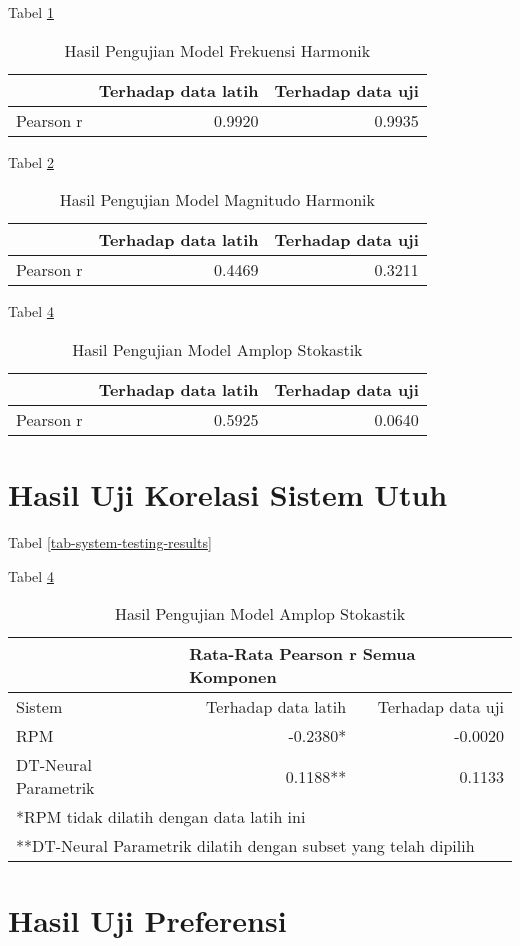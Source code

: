 Tabel \ref{tab-freq-testing-results} \blindtext
\begin{table}[h]
    \centering
    \caption{Hasil Pengujian Model Frekuensi Harmonik}\label{tab-freq-testing-results}
    \begin{tabular}{ |l|r|r| } 
     \cline{2-3}
     \multicolumn{1}{l|}{}&Terhadap data latih&Terhadap data uji\\\hline
	 Pearson r&0.9920  &0.9935\\\hline
    \end{tabular}
\end{table}

Tabel \ref{tab-mag-testing-results} \blindtext
\begin{table}[h]
    \centering
    \caption{Hasil Pengujian Model Magnitudo Harmonik}\label{tab-mag-testing-results}
    \begin{tabular}{ |l|r|r| } 
     \cline{2-3}
     \multicolumn{1}{l|}{}&Terhadap data latih&Terhadap data uji\\\hline
	 Pearson r&0.4469  &0.3211\\\hline
    \end{tabular}
\end{table}

Tabel \ref{tab-stoc-testing-results} \blindtext
\begin{table}[h]
    \centering
    \caption{Hasil Pengujian Model Amplop Stokastik}\label{tab-stoc-testing-results}
    \begin{tabular}{ |l|r|r| } 
     \cline{2-3}
     \multicolumn{1}{l|}{}&Terhadap data latih&Terhadap data uji\\\hline
	 Pearson r&0.5925  &0.0640\\\hline
    \end{tabular}
\end{table}

\section{Hasil Uji Korelasi Sistem Utuh}
Tabel \ref{tab-system-testing-results}\blindtext

Tabel \ref{tab-stoc-testing-results} \blindtext
\begin{table}[h]
    \centering
    \caption{Hasil Pengujian Model Amplop Stokastik}\label{tab-stoc-testing-results}
    \begin{tabular}{ |l|r|r| } 
     \cline{2-3}
     \multicolumn{1}{l|}{}&\multicolumn{2}{|l|}{Rata-Rata Pearson r Semua Komponen}\\\hline
     Sistem&Terhadap data latih&Terhadap data uji\\\hline
	 RPM&-0.2380* &-0.0020\\\hline
	 DT-Neural Parametrik& 0.1188**&0.1133\\\hline
	 \multicolumn{3}{l|}{*RPM tidak dilatih dengan data latih ini}\\
	 \multicolumn{3}{l|}{**DT-Neural Parametrik dilatih dengan subset yang telah dipilih}\\
    \end{tabular}
\end{table}


\section{Hasil Uji Preferensi}
\blindtext
